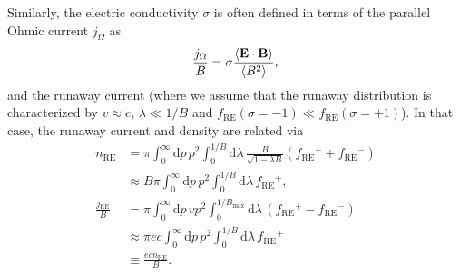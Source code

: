 \documentclass[11pt,a4paper]{article}
\newcommand{\rd}{\ensuremath{\mathrm{d}}}
\newcommand{\sub}[1]{\ensuremath{_{\text{#1}}}}
\renewcommand{\b}[1]{\ensuremath{ {\bf #1 } }}
\begin{document}
Similarly, the electric conductivity $\sigma$ is often defined in terms of the parallel Ohmic current $j_\Omega$ as
\begin{align}
\frac{j_\Omega}{B} = \sigma \frac{\langle \b{E}\cdot\b{B} \rangle}{\langle B^2\rangle},
\end{align}
and the runaway current (where we assume that the runaway distribution is characterized by $v\approx c$, $\lambda \ll 1/B$ and $f\sub{RE}(\sigma=-1) \ll f\sub{RE}(\sigma=+1)$). In that case, the runaway current and density are related via
\begin{align}
n\sub{RE} &= \pi\int_0^\infty \rd p \,p^2\int_0^{1/B}\rd \lambda \,\frac{B}{\sqrt{1-\lambda B}}(f\sub{RE}^+ + f\sub{RE}^-) \nonumber \\
&\approx B \pi \int_0^\infty \rd p \,p^2\int_0^{1/B}\rd \lambda \, f\sub{RE}^+, \nonumber \\
\frac{j\sub{RE}}{B} &= \pi\int_0^\infty \rd p \,vp^2 \int_0^{1/B\sub{max}}\rd\lambda \, (f\sub{RE}^+-f\sub{RE}^-)\nonumber \\
&\approx  \pi ec\int_0^\infty \rd p \,p^2 \int_0^{1/B}\rd\lambda \, f\sub{RE}^+ \nonumber \\
&\equiv \frac{ec n\sub{RE}}{B}.
\end{align}
\end{document}

